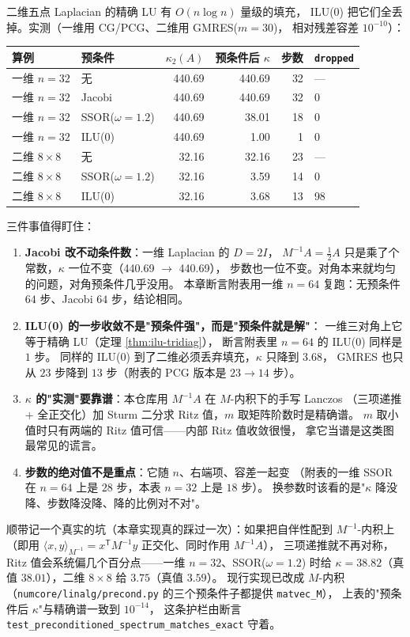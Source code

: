\begin{remark}
\label{rem:ilu2d}
二维五点 Laplacian 的精确 LU 有 $O(n\log n)$ 量级的填充，
ILU(0) 把它们全丢掉。实测（一维用 CG/PCG、二维用 GMRES($m=30$)，
相对残差容差 $10^{-10}$）：
\begin{center}
\begin{tabular}{llrrrl}
\toprule
算例 & 预条件 & $\kappa_2(A)$ & 预条件后 $\kappa$ & 步数 & \texttt{dropped}\\
\midrule
一维 $n=32$ & 无 & 440.69 & 440.69 & 32 & ---\\
一维 $n=32$ & Jacobi & 440.69 & 440.69 & 32 & 0\\
一维 $n=32$ & SSOR($\omega=1.2$) & 440.69 & 38.01 & 18 & 0\\
一维 $n=32$ & ILU(0) & 440.69 & 1.00 & 1 & 0\\
\midrule
二维 $8\times8$ & 无 & 32.16 & 32.16 & 23 & ---\\
二维 $8\times8$ & SSOR($\omega=1.2$) & 32.16 & 3.59 & 14 & 0\\
二维 $8\times8$ & ILU(0) & 32.16 & 3.68 & 13 & 98\\
\bottomrule
\end{tabular}
\end{center}
三件事值得盯住：
\begin{enumerate}
  \item \textbf{Jacobi 改不动条件数}：一维 Laplacian 的 $D=2I$，
        $M^{-1}A=\frac12A$ 只是乘了个常数，$\kappa$ 一位不变（440.69 $\to$ 440.69），
        步数也一位不变。对角本来就均匀的问题，对角预条件几乎没用。
        本章断言附表用一维 $n=64$ 复跑：无预条件 $64$ 步、Jacobi $64$ 步，结论相同。
  \item \textbf{ILU(0) 的一步收敛不是"预条件强"，而是"预条件就是解"}：
        一维三对角上它等于精确 LU（定理 \ref{thm:ilu-tridiag}），
        断言附表里 $n=64$ 的 ILU(0) 同样是 $1$ 步。
        同样的 ILU(0) 到了二维必须丢弃填充，$\kappa$ 只降到 $3.68$，
        GMRES 也只从 $23$ 步降到 $13$ 步（附表的 PCG 版本是 $23\to14$ 步）。
  \item \textbf{$\kappa$ 的"实测"要靠谱}：本仓库用 $M^{-1}A$ 在 $M$-内积下的手写 Lanczos
        （三项递推 + 全正交化）加 Sturm 二分求 Ritz 值，$m$ 取矩阵阶数时是精确谱。
        $m$ 取小值时只有两端的 Ritz 值可信——内部 Ritz 值收敛很慢，
        拿它当谱是这类图最常见的谎言。
  \item \textbf{步数的绝对值不是重点}：它随 $n$、右端项、容差一起变
        （附表的一维 SSOR 在 $n=64$ 上是 $28$ 步，本表 $n=32$ 上是 $18$ 步）。
        换参数时该看的是"$\kappa$ 降没降、步数降没降、降的比例对不对"。
\end{enumerate}
顺带记一个真实的坑（本章实现真的踩过一次）：如果把自伴性配到 $M^{-1}$-内积上
（即用 $\langle x,y\rangle_{M^{-1}}=x^{\mathsf T}M^{-1}y$ 正交化、同时作用 $M^{-1}A$），
三项递推就不再对称，Ritz 值会系统偏几个百分点——一维 $n=32$、SSOR($\omega=1.2$) 时给
$\kappa=38.82$（真值 $38.01$），二维 $8\times8$ 给 $3.75$（真值 $3.59$）。
现行实现已改成 $M$-内积（\texttt{numcore/linalg/precond.py} 的三个预条件子都提供 \texttt{matvec\_M}），
上表的"预条件后 $\kappa$"与精确谱一致到 $10^{-14}$，
这条护栏由断言 \texttt{test\_preconditioned\_spectrum\_matches\_exact} 守着。
\end{remark}

